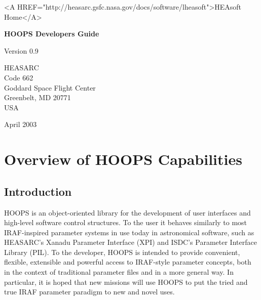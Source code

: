 
\htmladdtonavigation
   {\begin{rawhtml}
 <A HREF="http://heasarc.gsfc.nasa.gov/docs/software/lheasoft">HEAsoft Home</A>
    \end{rawhtml}}
\oddsidemargin=0.00in
\evensidemargin=0.00in
\textwidth=6.5in
\topmargin=0.0in
\textheight=8.5in
\parindent=0cm
\parskip=0.2cm


\begin{titlepage}
\normalsize
\vspace*{4.0cm}
\begin{center}
{\Huge \bf HOOPS Developers Guide}\\
\end{center}
\medskip 
\medskip
\begin{center}
{\Large Version 0.9 \\}
\end{center}
\bigskip
\vskip 2.5cm
\begin{center}
{HEASARC\\
Code 662\\
Goddard Space Flight Center\\
Greenbelt, MD 20771\\
USA}
\end{center}

\vfill
\bigskip
\begin{center}
{\Large April 2003\\}
\end{center}
\vfill
\end{titlepage}

\begin{titlepage}
\vspace*{7.6cm}
\vfill
\end{titlepage}


\tableofcontents

\chapter{Overview of HOOPS Capabilities}

\section{Introduction}
HOOPS is an object-oriented library for the development
of user interfaces and high-level software control
structures. To the user it behaves similarly to most
IRAF-inspired parameter systems in use today in
astronomical software, such as HEASARC's Xanadu Parameter
Interface (XPI) and ISDC's Parameter Interface Library (PIL).
To the developer, HOOPS is intended
to provide convenient, flexible, extensible and powerful
access to IRAF-style parameter concepts, both in the
context of traditional parameter files and in a more
general way. In particular,
it is hoped that new missions will use HOOPS to put
the tried and true IRAF parameter paradigm to new and
novel uses.


